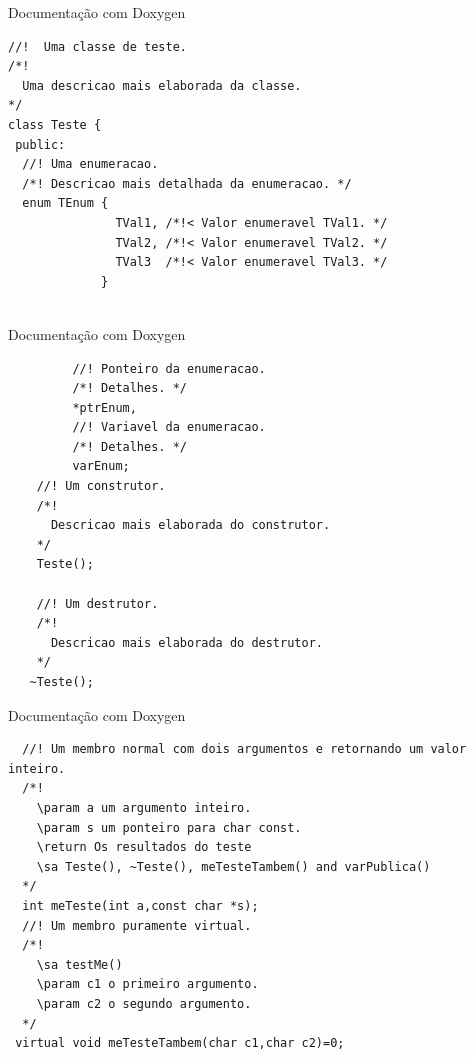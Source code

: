 \documentclass[12pt,table,xcolor={dvipsnames}]{beamer}
\begin{document}
\begin{frame}[fragile]{Documentação com Doxygen}
\begin{lstlisting}
//!  Uma classe de teste.
/*!
  Uma descricao mais elaborada da classe.
*/
class Teste {
 public:
  //! Uma enumeracao.
  /*! Descricao mais detalhada da enumeracao. */
  enum TEnum {
               TVal1, /*!< Valor enumeravel TVal1. */
               TVal2, /*!< Valor enumeravel TVal2. */
               TVal3  /*!< Valor enumeravel TVal3. */
             }
   
\end{lstlisting}
\end{frame}

\begin{frame}[fragile]{Documentação com Doxygen}
\begin{lstlisting}
         //! Ponteiro da enumeracao.
         /*! Detalhes. */
         *ptrEnum,
         //! Variavel da enumeracao.
         /*! Detalhes. */
         varEnum;
    //! Um construtor.
    /*!
      Descricao mais elaborada do construtor.
    */
    Teste();
 
    //! Um destrutor.
    /*!
      Descricao mais elaborada do destrutor.
    */
   ~Teste();
\end{lstlisting}
\end{frame}

\begin{frame}[fragile]{Documentação com Doxygen}
\begin{lstlisting}
  //! Um membro normal com dois argumentos e retornando um valor inteiro.
  /*!
    \param a um argumento inteiro.
    \param s um ponteiro para char const.
    \return Os resultados do teste
    \sa Teste(), ~Teste(), meTesteTambem() and varPublica()
  */
  int meTeste(int a,const char *s);
  //! Um membro puramente virtual.
  /*!
    \sa testMe()
    \param c1 o primeiro argumento.
    \param c2 o segundo argumento.
  */
 virtual void meTesteTambem(char c1,char c2)=0;
\end{lstlisting}
\end{frame}
\end{document}
